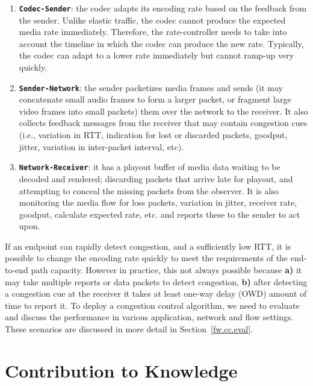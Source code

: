\begin{enumerate}

\item \textbf{\texttt{Codec-Sender}}: the codec adapts its encoding rate based
on the feedback from the sender. Unlike elastic traffic, the codec cannot
produce the expected media rate immediately. Therefore, the rate-controller
needs to take into account the timeline in which the codec can produce the new
rate. Typically, the codec can adapt to a lower rate immediately but cannot
ramp-up very quickly.

\item \textbf{\texttt{Sender-Network}}: the sender packetizes media frames and
sends (it may concatenate small audio frames to form a larger packet, or
fragment large video frames into small packets) them over the network to the
receiver. It also collects feedback messages from the receiver that may
contain congestion cues (i.e., variation in RTT, indication for lost or
discarded packets, goodput, jitter, variation in inter-packet interval, etc).

\item \textbf{\texttt{Network-Receiver}}: it has a playout buffer of media
data waiting to be decoded and rendered; discarding packets that arrive late
for playout, and attempting to conceal the missing packets from the observer.
It is  also monitoring the media flow for loss packets, variation in jitter,
receiver rate, goodput, calculate expected rate, etc. and reports these to the
sender to act upon.

\end{enumerate}

If an endpoint can rapidly detect congestion, and a sufficiently low RTT, it
is possible to change the encoding rate quickly to meet the requirements of
the end-to-end path capacity. However in practice, this not always possible
because \textbf{a)} it may take multiple reports or data packets to detect
congestion, \textbf{b)} after detecting a congestion cue at the receiver it
takes at least one-way delay (OWD) amount of time to report it. To deploy a
congestion control algorithm, we need to evaluate and discuss the performance
in various application, network and flow settings. These scenarios are
discussed in more detail in Section~\ref{fw.cc.eval}.

\section{Contribution to Knowledge}

